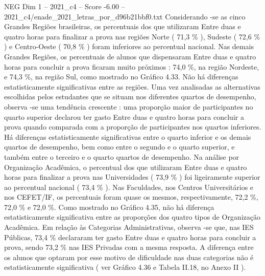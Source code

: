 \begin{textsample}{NEG Dim 1 – 2021\_c4 – Score -6.00 – 2021\_c4/enade\_2021\_letras\_por\_d96b21bbf0.txt}
Considerando -se as cinco Grandes Regiões brasileiras, os percentuais dos que utilizaram Entre duas e quatro horas para finalizar a prova nas regiões Norte ( 71,3 \% ), Sudeste ( 72,6 \% ) e Centro-Oeste ( 70,8 \% ) foram inferiores ao percentual nacional.
Nas demais Grandes Regiões, os percentuais de alunos que dispensaram Entre duas e quatro horas para concluir a prova ficaram muito próximos : 74,0 \%, na região Nordeste, e 74,3 \%, na região Sul, como mostrado no Gráfico 4.33.
Não há diferenças estatisticamente significativas entre as regiões.
Uma vez analisadas as alternativas escolhidas pelos estudantes que se situam nos diferentes quartos de desempenho, observa -se uma tendência crescente : uma proporção maior de participantes no quarto superior declarou ter gasto Entre duas e quatro horas para concluir a prova quando comparada com a proporção de participantes nos quartos inferiores.
Há diferenças estatisticamente significativas entre o quarto inferior e os demais quartos de desempenho, bem como entre o segundo e o quarto superior, e também entre o terceiro e o quarto quartos de desempenho.
Na análise por Organização Acadêmica, o percentual dos que utilizaram Entre duas e quatro horas para finalizar a prova nas Universidades ( 73,9 \% ) foi ligeiramente superior ao percentual nacional ( 73,4 \% ).
Nas Faculdades, nos Centros Universitários e nos CEFET/IF, os percentuais foram quase os mesmos, respectivamente, 72,2 \%, 72,0 \% e 72,0 \%.
Como mostrado no Gráfico 4.35, não há diferença estatisticamente significativa entre as proporções dos quatro tipos de Organização Acadêmica.
Em relação às Categorias Administrativas, observa -se que, nas IES Públicas, 73,4 \% declararam ter gasto Entre duas e quatro horas para concluir a prova, sendo 73,2 \% nas IES Privadas com a mesma resposta.
A diferença entre os alunos que optaram por esse motivo de dificuldade nas duas categorias não é estatisticamente significativa ( ver Gráfico 4.36 e Tabela II.18, no Anexo II ).

\end{textsample}
